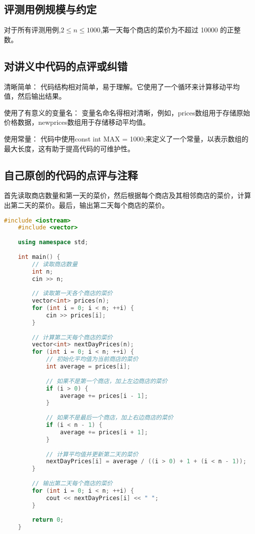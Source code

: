 \subsection{评测用例规模与约定}

对于所有评测用例,$2\leq n\leq1000$,第一天每个商店的菜价为不超过 10000 的正整数。

\subsection{对讲义中代码的点评或纠错}
清晰简单： 代码结构相对简单，易于理解。它使用了一个循环来计算移动平均值，然后输出结果。

使用了有意义的变量名： 变量名命名得相对清晰，例如，prices数组用于存储原始价格数据，newprices数组用于存储移动平均值。

使用常量： 代码中使用const int MAX = 1000;来定义了一个常量，以表示数组的最大长度，这有助于提高代码的可维护性。

\subsection{自己原创的代码的点评与注释}

首先读取商店数量和第一天的菜价，然后根据每个商店及其相邻商店的菜价，计算出第二天的菜价。最后，输出第二天每个商店的菜价。

\begin{lstlisting}[language=C++]
    #include <iostream>
    #include <vector>
    
    using namespace std;
    
    int main() {
        // 读取商店数量
        int n;
        cin >> n;
    
        // 读取第一天各个商店的菜价
        vector<int> prices(n);
        for (int i = 0; i < n; ++i) {
            cin >> prices[i];
        }
    
        // 计算第二天每个商店的菜价
        vector<int> nextDayPrices(n);
        for (int i = 0; i < n; ++i) {
            // 初始化平均值为当前商店的菜价
            int average = prices[i];
    
            // 如果不是第一个商店，加上左边商店的菜价
            if (i > 0) {
                average += prices[i - 1];
            }
    
            // 如果不是最后一个商店，加上右边商店的菜价
            if (i < n - 1) {
                average += prices[i + 1];
            }
    
            // 计算平均值并更新第二天的菜价
            nextDayPrices[i] = average / ((i > 0) + 1 + (i < n - 1));
        }
    
        // 输出第二天每个商店的菜价
        for (int i = 0; i < n; ++i) {
            cout << nextDayPrices[i] << " ";
        }
    
        return 0;
    }
    
\end{lstlisting}